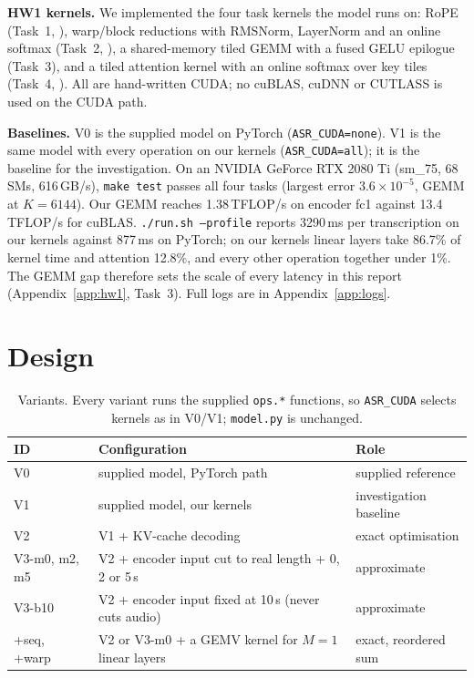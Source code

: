 \documentclass{article}
\begin{document}
\textbf{HW1 kernels.} We implemented the four task kernels the model runs on:
RoPE (Task~1, \citealp{su2021roformer}), warp/block reductions with RMSNorm,
LayerNorm and an online softmax (Task~2, \citealp{milakov2018online}),
a shared-memory tiled GEMM with a fused GELU epilogue (Task~3), and a tiled
attention kernel with an online softmax over key tiles (Task~4,
\citealp{vaswani2017attention,dao2022flashattention}). All are hand-written CUDA; no
cuBLAS, cuDNN or CUTLASS is used on the CUDA path.

\textbf{Baselines.} V0 is the supplied model on PyTorch (\texttt{ASR\_CUDA=none}).
V1 is the same model with every operation on our kernels (\texttt{ASR\_CUDA=all});
it is the baseline for the investigation. On an NVIDIA GeForce RTX 2080 Ti (sm\_75,
68 SMs, 616\,GB/s), \texttt{make test} passes all four tasks (largest error $3.6{\times}10^{-5}$, GEMM at
$K=6144$). Our GEMM reaches 1.38\,TFLOP/s
on encoder fc1 against 13.4\,TFLOP/s for cuBLAS. \texttt{./run.sh --profile} reports
3290\,ms per transcription on our kernels against 877\,ms on PyTorch; on our kernels
linear layers take 86.7\% of kernel time and attention 12.8\%, and every other
operation together under 1\%. The GEMM gap therefore sets the scale of every
latency in this report (Appendix~\ref{app:hw1}, Task~3). Full logs are in
Appendix~\ref{app:logs}.

\section{Design}
\label{sec:design}

\begin{table}[t]
\centering
\small
\caption{Variants. Every variant runs the supplied \texttt{ops.*} functions, so
\texttt{ASR\_CUDA} selects kernels as in V0/V1; \texttt{model.py} is unchanged.}
\label{tab:variants}
\setlength{\tabcolsep}{4pt}
\begin{tabular}{lll}
\toprule
ID & Configuration & Role \\
\midrule
V0 & supplied model, PyTorch path & supplied reference \\
V1 & supplied model, our kernels & investigation baseline \\
V2 & V1 + KV-cache decoding & exact optimisation \\
V3-m0, m2, m5 & V2 + encoder input cut to real length + 0, 2 or 5\,s & approximate \\
V3-b10 & V2 + encoder input fixed at 10\,s (never cuts audio) & approximate \\
+seq, +warp & V2 or V3-m0 + a GEMV kernel for $M=1$ linear layers & exact, reordered sum \\
\bottomrule
\end{tabular}
\end{table}
\end{document}
